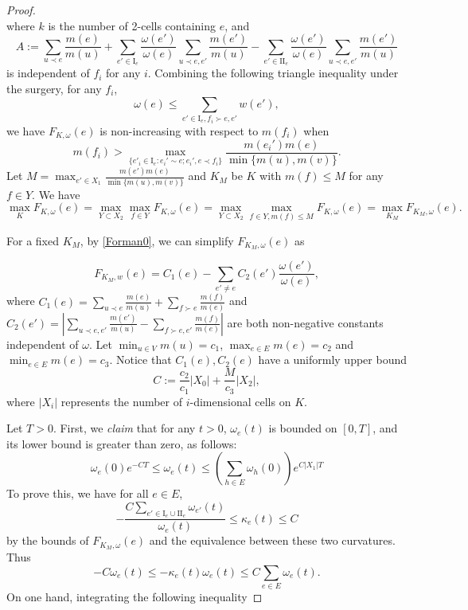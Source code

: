 \documentclass{article}
\begin{document}
\begin{proof}
\begin{equation*}
\end{equation*}
where $k$ is the number of 2-cells containing $e$, and  \[A:=\sum_{u\prec e}\frac{m(e)}{m(u)}+\sum_{e'\in \mathrm{I}_e}\frac{\omega(e')}{\omega(e)}\sum_{u\prec e,e'}\frac{m(e')}{m(u)}-\sum_{e'\in \mathrm{II}_e}\frac{\omega(e')}{\omega(e)}\sum_{u\prec e,e'}\frac{m(e')}{m(u)}\]
is independent of $f_i$ for any $i$. Combining the following triangle inequality under the surgery, for any $f_i$,
\[\omega(e)\leq \sum_{e'\in\mathrm{I}_e, f_i\succ e,e'}w(e'),\]
we have $F_{K,\omega}(e)$ is non-increasing with respect to $m(f_i)$ when 
\[m(f_i)>\max_{\{e'_i\in\mathrm{I}_e:e_i'\sim e;e_i',e\prec f_i\}}\frac{m(e_i')m(e)}{\min\{m(u),m(v)\}}.\]
Let $M=\max_{e'\in X_1}\frac{m(e')m(e)}{\min\{m(u),m(v)\}}$ and $K_M$ be $K$ with $m(f)\leq M$ for any $f\in Y$. We have 
\[\max_KF_{K,\omega}(e)=\max_{Y\subset X_2}\max_{f\in Y}F_{K,\omega}(e)=\max_{Y\subset X_2}\max_{f\in Y, m(f)\leq M}F_{K,\omega}(e)=\max_{K_M}F_{K_M,\omega}(e).\]

For a fixed $K_M$, by \eqref{Forman0}, we can simplify $F_{K_M,\omega}(e)$ as 

    \[ F_{K_M,w}(e) = C_1(e) - \sum_{e' \neq e} C_2(e')\frac{\omega(e')}{\omega(e)}, \]
where \( C_1(e) = \sum_{u\prec e}\frac{m(e)}{m(u)}+\sum_{f\succ e}\frac{m(f)}{m(e)} \) and \( C_2(e') = \left|\sum_{u\prec e,e'}\frac{m(e')}{m(u)}-\sum_{f\succ e,e'}\frac{m(f)}{m(e)}\right|\) are both non-negative constants independent of \( \omega \). Let $\min_{u\in V}m(u)=c_1$, $\max_{e\in E}m(e)=c_2$ and $\min_{e\in E}m(e)=c_3$. 
Notice that $C_1(e),C_2(e)$ have a uniformly upper bound 
\[C:=\frac{c_2}{c_1}|X_0|+\frac{M}{c_3}|X_2|,\]
where $|X_i|$ represents the number of $i$-dimensional cells on $K$. 

Let $T>0$. First, we {\it claim} that  for any $t>0$, $\omega_e(t)$ is  bounded on $[0,T]$, and its lower bound is greater than zero, as follows:
\begin{equation}\label{bounds}
    \omega_e(0)e^{-CT}\leq \omega_e(t)  \leq  \left(\sum_{h \in E} \omega_h(0)\right)e^{C|X_1|T}
\end{equation} 
To prove this, we have for all \( e \in E \),
\[
-\frac{C\sum_{e'\in \mathrm{I}_e\cup \mathrm{II}_e}\omega_{e'}(t)}{\omega_e(t)} \leq \kappa_e(t) \leq C
\]
by the bounds of $F_{K_M,\omega}(e)$ and the equivalence between these two curvatures.
Thus 
\[
-C\omega_e(t)\leq -\kappa_e(t)\omega_e(t) \leq C\sum_{e\in E}\omega_{e}(t) . 
\]
On one hand, integrating the following inequality


\end{proof}
\end{document}

